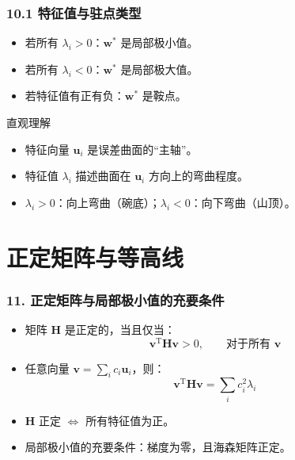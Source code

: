 \documentclass[t,aspectratio=169]{beamer} %
\begin{document}
\begin{frame}
    \frametitle{10.1 特征值与驻点类型}
    \begin{itemize}
        \item 若所有 $\lambda_i > 0$：$\mathbf{w}^*$ 是\alert{局部极小值}。
        \item 若所有 $\lambda_i < 0$：$\mathbf{w}^*$ 是\alert{局部极大值}。
        \item 若特征值有正有负：$\mathbf{w}^*$ 是\alert{鞍点}。
    \end{itemize}
    \begin{block}{直观理解}
        \begin{itemize}
            \item 特征向量 $\mathbf{u}_i$ 是误差曲面的“主轴”。
            \item 特征值 $\lambda_i$ 描述曲面在 $\mathbf{u}_i$ 方向上的弯曲程度。
            \item $\lambda_i > 0$：向上弯曲（碗底）；$\lambda_i < 0$：向下弯曲（山顶）。
        \end{itemize}
    \end{block}
\end{frame}

\section{正定矩阵与等高线}

\begin{frame}
    \frametitle{11. 正定矩阵与局部极小值的充要条件}
    \begin{itemize}
        \item 矩阵 $\mathbf{H}$ 是\alert{正定}的，当且仅当：
        \begin{equation}
        \mathbf{v}^\mathrm{T} \mathbf{H} \mathbf{v} > 0, \qquad \text{对于所有 } \mathbf{v}
        \tag{7.12}
        \end{equation}
        \item 任意向量 $\mathbf{v} = \sum_i c_i \mathbf{u}_i$，则：
        \begin{equation}
        \mathbf{v}^\mathrm{T} \mathbf{H} \mathbf{v} = \sum_i c_i^2 \lambda_i
        \tag{7.14}
        \end{equation}
        \item $\mathbf{H}$ 正定 $\Leftrightarrow$ 所有特征值为正。
        \item \alert{局部极小值的充要条件}：梯度为零，且海森矩阵正定。
    \end{itemize}
\end{frame}
\end{document}
